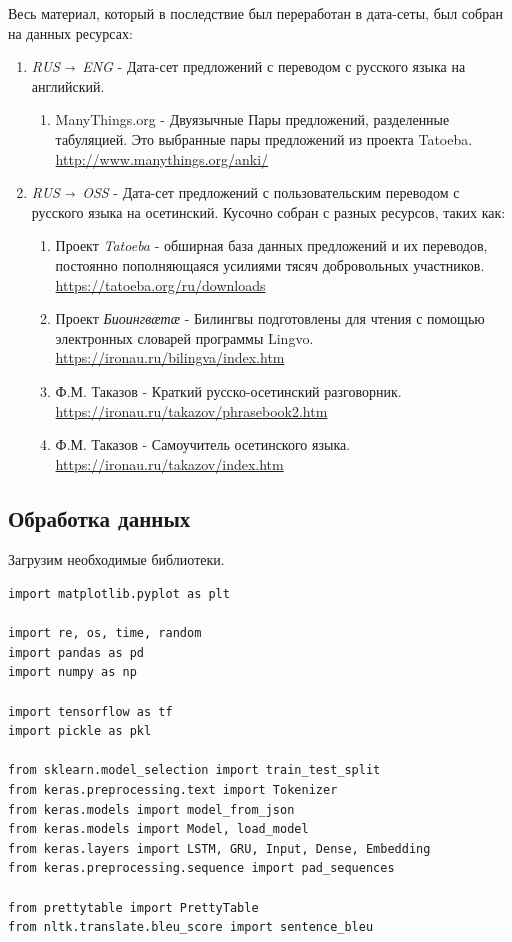 	Весь материал, который в последствие был переработан в дата-сеты, был собран на данных ресурсах: 
	
	\begin{enumerate}
		\item \textit{RUS $\shortrightarrow$ ENG} - Дата-сет предложений с переводом с русского языка на английский.
		\begin{enumerate}
			\item ManyThings.org - Двуязычные Пары предложений, разделенные табуляцией. 
			Это выбранные пары предложений из проекта Tatoeba. \\ 
			\url{http://www.manythings.org/anki/}
		\end{enumerate}
		\item \textit{RUS $\shortrightarrow$ OSS} - Дата-сет предложений с пользовательским переводом с русского языка на осетинский.
		Кусочно собран с разных ресурсов, таких как:
		\begin{enumerate}
			 \item Проект \textit{Tatoeba} - обширная база данных предложений и их переводов, постоянно пополняющаяся усилиями тясяч добровольных участников. \\ \url{https://tatoeba.org/ru/downloads}
			 \item Проект \textit{Биоингвӕтӕ} - Билингвы подготовлены для чтения с помощью электронных словарей программы Lingvo. \\ \url{https://ironau.ru/bilingva/index.htm}
			 \item Ф.М. Таказов - Краткий русско-осетинский разговорник. \\ \url{https://ironau.ru/takazov/phrasebook2.htm}
			 \item Ф.М. Таказов - Самоучитель осетинского языка. \\ \url{https://ironau.ru/takazov/index.htm}
 		\end{enumerate}
	\end{enumerate}
	
	\subsection{Обработка данных}
	
	Загрузим необходимые библиотеки.
	
	\begin{lstlisting}[language=iPython]
import matplotlib.pyplot as plt

import re, os, time, random
import pandas as pd
import numpy as np

import tensorflow as tf
import pickle as pkl

from sklearn.model_selection import train_test_split
from keras.preprocessing.text import Tokenizer
from keras.models import model_from_json
from keras.models import Model, load_model
from keras.layers import LSTM, GRU, Input, Dense, Embedding
from keras.preprocessing.sequence import pad_sequences

from prettytable import PrettyTable
from nltk.translate.bleu_score import sentence_bleu \end{lstlisting}


